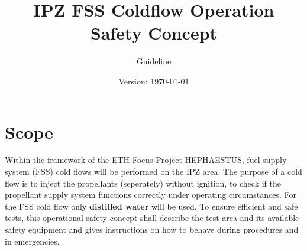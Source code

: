 \documentclass{article}
\title{IPZ FSS Coldflow Operation Safety Concept}
\author{Guideline}
\date{Version: \isodate\today}
\begin{document}
\maketitle

\thispagestyle{fancy}

\section{Scope}

Within the framework of the ETH Focus Project HEPHAESTUS, fuel supply system (FSS) cold flows will be performed on the IPZ area. The purpose of a cold flow is to inject the propellants (seperately) without ignition, to check if the propellant supply system functions correctly under operating circumstances.  
\noindent
For the FSS cold flow only \textbf{distilled water} will be used. To ensure efficient and safe tests, this operational safety concept shall describe the test area and its available safety equipment and gives instructions on how to behave during procedures and in emergencies.
\end{document}
